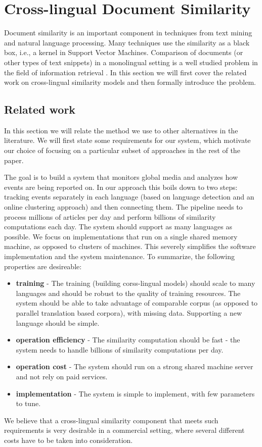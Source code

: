 \documentclass[twoside,11pt]{article}
\begin{document}
\section{Cross-lingual Document Similarity}\label{sec:crosslingual}
\label{sec:crosslingual}
Document similarity is an important component in techniques from text mining and natural language processing. Many techniques use the similarity as a black box, i.e., a kernel in Support Vector Machines. Comparison of documents (or other types of text snippets) in a monolingual setting is a well studied problem in the field of information retrieval \cite{Salton88term-weightingapproaches}. In this section we will first cover the related work on cross-lingual similarity models and then formally introduce the problem.

\subsection{Related work}

In this section we will relate the method we use to other alternatives in the literature. We will first state some requirements for our system, which motivate our choice of focusing on a particular subset of approaches in the rest of the paper.

The goal is to build a system that monitors global media and analyzes how events are being reported on. In our approach this boils down to two steps: tracking events separately in each language (based on language detection and an online clustering approach) and then connecting them. The pipeline needs to process millions of articles per day and perform billions of similarity computations each day. The system should support as many languages as possible. We focus on implementations that run on a single shared memory machine, as opposed to clusters of machines. This severely simplifies the software implementation and the system maintenance.
To summarize, the following properties are desireable:
\begin{itemize}
\item \textbf{training} - The training (building corss-lingual models) should scale to many languages and should be robust to the quality of training resources. The system should be able to take advantage of comparable corpus (as opposed to parallel translation based corpora), with missing data. Supporting a new language should be simple.
\item \textbf{operation efficiency} - The similarity computation should be fast - the system needs to handle billions of similarity computations per day.
\item \textbf{operation cost} - The system should run on a strong shared machine server and not rely on paid services.
\item \textbf{implementation} - The system is simple to implement, with few parameters to tune.
\end{itemize}
We believe that a cross-lingual similarity component that meets such requirements is very desirable in a commercial setting, where several different costs have to be taken into consideration.
\end{document}
